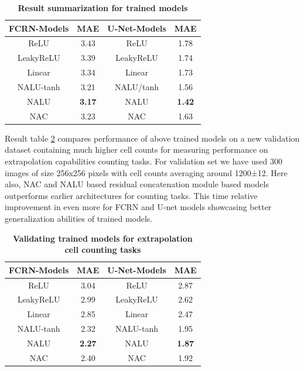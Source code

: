\documentclass[conference]{IEEEtran}
\begin{document}
\bgroup
\def\arraystretch{1.25}
\begin{table}[h!]
  \begin{center}
    \caption{\textbf{Result summarization for trained models}}
    \label{tab:table2}
    \begin{tabular}{|c|c|c|c|}
    
    \hline
      \textbf{FCRN-Models} & \textbf{MAE} & \textbf{U-Net-Models} & \textbf{MAE} \\
    \hline

     ReLU  & 3.43 & ReLU & 1.78\\
     LeakyReLU  & 3.39 & LeakyReLU & 1.74\\
     Linear  & 3.34 & Linear & 1.73\\
	 NALU-tanh & 3.21 & NALU/tanh & 1.56\\
	 NALU & \textbf{3.17} & NALU & \textbf{1.42}\\
     NAC & 3.23 & NAC & 1.63\\
     
     \hline
     \end{tabular}
  \end{center}
\end{table}
\egroup


Result table \ref{tab:table3} compares performance of above trained models on a new validation dataset containing much higher cell counts for measuring performance on extrapolation capabilities counting tasks. For validation set we have used 300 images of size 256x256 pixels with cell counts averaging around 1200±12. Here also, NAC and NALU based residual concatenation module based models outperforms earlier architectures for counting tasks. This time relative improvement in even more for FCRN and U-net models showcasing better generalization abilities of trained models.

\bgroup
\def\arraystretch{1.25}
\begin{table}[h!]
  \begin{center}
    \caption{\textbf{Validating trained models for extrapolation cell counting tasks}}
    \label{tab:table3}
    \begin{tabular}{|c|c|c|c|}
     
         \hline
      \textbf{FCRN-Models} & \textbf{MAE} & \textbf{U-Net-Models} & \textbf{MAE} \\
    \hline

     ReLU  & 3.04 & ReLU & 2.87\\
     LeakyReLU  & 2.99 & LeakyReLU & 2.62\\
     Linear  & 2.85 & Linear & 2.47\\
	 NALU-tanh & 2.32 & NALU-tanh & 1.95\\
	 NALU & \textbf{2.27} & NALU & \textbf{1.87}\\
     NAC & 2.40 & NAC & 1.92\\
    
     \hline
     \end{tabular}
  \end{center}
\end{table}
\egroup
\end{document}
